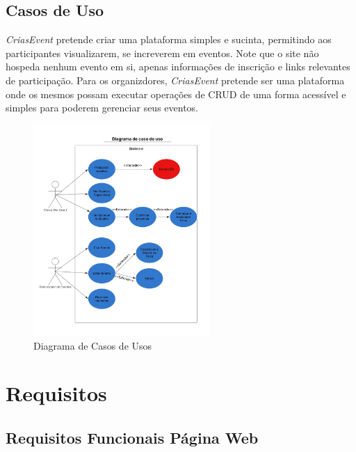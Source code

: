 \section{Casos de Uso}
\textit{CriasEvent} pretende criar uma plataforma simples e sucinta, permitindo aos participantes visualizarem, se increverem em eventos. Note que o site não hospeda nenhum evento em si, apenas informações de inscrição e links relevantes de participação. Para os organizdores, \textit{CriasEvent} pretende ser uma plataforma onde os mesmos possam executar operações de CRUD de uma forma acessível e simples para poderem gerenciar seus eventos.

\begin{figure}[h]
  \centering
  \includegraphics[width=0.6\textwidth]{images/user_case}
  \caption{Diagrama de Casos de Usos}
  \label{fig:diagram_user_case}
\end{figure}

\chapter{Requisitos}
\label{Requisitos}

\section{Requisitos Funcionais Página Web}

